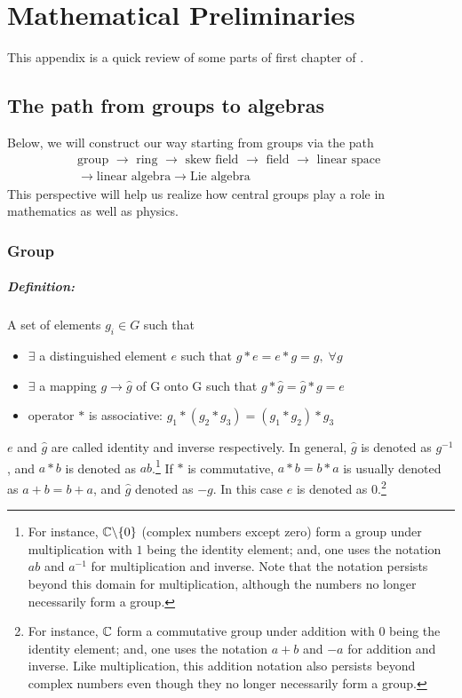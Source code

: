 \chapter{Mathematical Preliminaries}
This appendix is a quick review of some parts of first chapter of \cite{vilenkin2012representation}.
\section{The path from groups to algebras}
Below, we will construct our way starting from groups via the path
\begin{multline}
\text{group }\to\text{ ring }\to\text{ skew field }\to\text{ field }\to\text{ linear space }\\\to\text{linear algebra}\to\text{Lie algebra}
\end{multline}
This perspective will help us realize how central groups play a role in mathematics as well as physics.
\subsection{Group}
\paragraph{Definition:} A set of elements $g_i \in G$ such that
\begin{itemize}
	\item $\exists$ a distinguished element $e$ such that $g*e=e*g=g,\; \forall g$
	\item $\exists$ a mapping $g\to \hat g$ of G onto G such that $g*\hat g=\hat g*g=e$
	\item operator $*$ is associative: $g_1*(g_2*g_3)=(g_1*g_2)*g_3$
\end{itemize}
$e$ and $\hat g$ are called identity and inverse respectively. In general, $\hat g$ is denoted as $g^{-1}$, and $a*b$ is denoted as $a b$.\footnote{For instance, $\mathbb{C}\backslash\{0\}$ (complex numbers except zero) form a group under multiplication with $1$ being the identity element; and, one uses the notation $ab$ and $a^{-1}$ for multiplication and inverse. Note that the notation persists beyond this domain for multiplication, although the numbers no longer necessarily form a group.} If $*$ is commutative, $a*b=b*a$ is usually denoted as $a+b=b+a$, and $\hat g$ denoted as $-g$. In this case $e$ is denoted as $0$.\footnote{For instance, $\mathbb{C}$ form a commutative group under addition with $0$ being the identity element; and, one uses the notation $a+b$ and $-a$ for addition and inverse. Like multiplication, this addition notation also persists beyond complex numbers even though they no longer necessarily form a group.}


